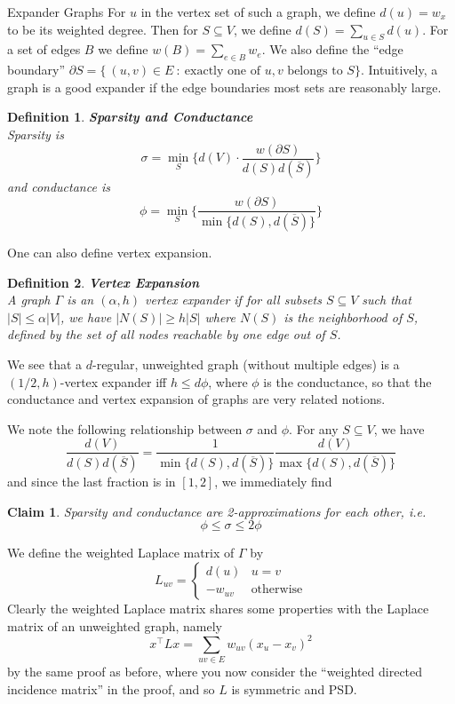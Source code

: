 \documentclass{article}
\newtheorem{claim}{Claim}
\newtheorem{defn}{Definition}
\begin{document}
\begin{section}{Expander Graphs}
   For $u$ in the vertex set of such a graph, we define $d(u) = w_x$ to be its weighted degree.
   Then for $S \subseteq V$, we define $d(S) = \sum_{u \in S}{d(u)}$.
   For a set of edges $B$ we define $w(B) = \sum_{e \in B}w_e$.
   We also define the ``edge boundary'' $\partial S = \{~(u,v) \in E~:~\text{exactly one of $u,v$ belongs to $S$}\}$.
   Intuitively, a graph is a good expander if the edge boundaries most sets are reasonably large.

   \begin{defn}{\textbf{Sparsity and Conductance}\\}
     Sparsity is 
     $$\sigma = \min_{S}\bigg\{d(V) \cdot \frac{w(\partial S)}{d(S)d(\overline S)}\bigg\}$$
     and conductance is
     $$
     \phi = \min_S\bigg\{\frac{w(\partial S)}{\min\{d(S),d(\overline S)\}}\bigg\}
     $$
   \end{defn}

   One can also define vertex expansion.
   \begin{defn}{\textbf{Vertex Expansion}\\}
     A graph $\Gamma$ is an $(\alpha, h)$ vertex expander if for all subsets $S \subseteq V$ such that $|S| \leq \alpha |V|$, we have $|N(S)| \geq h|S|$ where $N(S)$ is the neighborhood of $S$, defined by the set of all nodes reachable by one edge out of $S$.
   \end{defn}

   We see that a $d$-regular, unweighted graph (without multiple edges) is a $(1/2,h)$-vertex expander iff $h \leq d\phi$, where $\phi$ is the conductance, so that the conductance and vertex expansion of graphs are very related notions.

   We note the following relationship between $\sigma$ and $\phi$.
   For any $S \subseteq V$, we have
   $$
   \frac{d(V)}{d(S)d(\overline S)} = \frac{1}{\min\{d(S),d(\overline S)\}}\frac{d(V)}{\max\{d(S),d(\overline S)\}}
   $$
   and since the last fraction is in $[1,2]$, we immediately find
   \begin{claim}
   Sparsity and conductance are 2-approximations for each other, i.e.
   $$
   \phi \leq \sigma \leq 2\phi
   $$
   \end{claim}
   We define the weighted Laplace matrix of $\Gamma$ by
   $$L_{uv} = \begin{cases} d(u) & u = v \\ -w_{uv} & \text{otherwise} \end{cases} $$
   Clearly the weighted Laplace matrix shares some properties with the Laplace matrix of an unweighted graph, namely
   $$
   x^\intercal L x = \sum_{uv \in E} w_{uv}(x_u - x_v)^2
   $$
   by the same proof as before, where you now consider the ``weighted directed incidence matrix'' in the proof, and so $L$ is symmetric and PSD.


\end{section}
\end{document}
